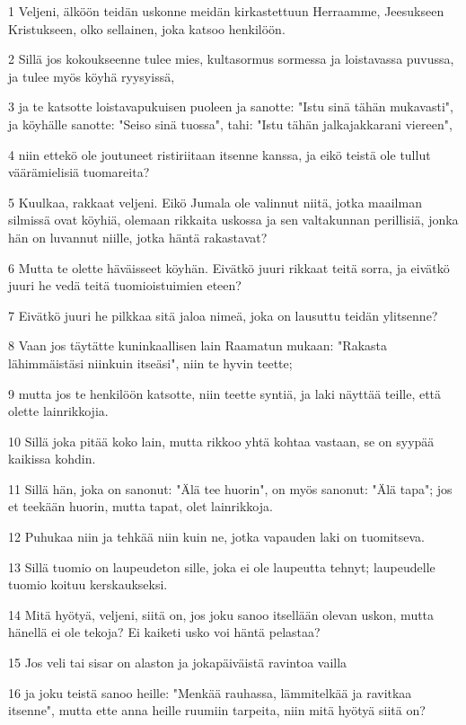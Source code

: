 \par 1 Veljeni, älköön teidän uskonne meidän kirkastettuun Herraamme, Jeesukseen Kristukseen, olko sellainen, joka katsoo henkilöön.
\par 2 Sillä jos kokoukseenne tulee mies, kultasormus sormessa ja loistavassa puvussa, ja tulee myös köyhä ryysyissä,
\par 3 ja te katsotte loistavapukuisen puoleen ja sanotte: "Istu sinä tähän mukavasti", ja köyhälle sanotte: "Seiso sinä tuossa", tahi: "Istu tähän jalkajakkarani viereen",
\par 4 niin ettekö ole joutuneet ristiriitaan itsenne kanssa, ja eikö teistä ole tullut väärämielisiä tuomareita?
\par 5 Kuulkaa, rakkaat veljeni. Eikö Jumala ole valinnut niitä, jotka maailman silmissä ovat köyhiä, olemaan rikkaita uskossa ja sen valtakunnan perillisiä, jonka hän on luvannut niille, jotka häntä rakastavat?
\par 6 Mutta te olette häväisseet köyhän. Eivätkö juuri rikkaat teitä sorra, ja eivätkö juuri he vedä teitä tuomioistuimien eteen?
\par 7 Eivätkö juuri he pilkkaa sitä jaloa nimeä, joka on lausuttu teidän ylitsenne?
\par 8 Vaan jos täytätte kuninkaallisen lain Raamatun mukaan: "Rakasta lähimmäistäsi niinkuin itseäsi", niin te hyvin teette;
\par 9 mutta jos te henkilöön katsotte, niin teette syntiä, ja laki näyttää teille, että olette lainrikkojia.
\par 10 Sillä joka pitää koko lain, mutta rikkoo yhtä kohtaa vastaan, se on syypää kaikissa kohdin.
\par 11 Sillä hän, joka on sanonut: "Älä tee huorin", on myös sanonut: "Älä tapa"; jos et teekään huorin, mutta tapat, olet lainrikkoja.
\par 12 Puhukaa niin ja tehkää niin kuin ne, jotka vapauden laki on tuomitseva.
\par 13 Sillä tuomio on laupeudeton sille, joka ei ole laupeutta tehnyt; laupeudelle tuomio koituu kerskaukseksi.
\par 14 Mitä hyötyä, veljeni, siitä on, jos joku sanoo itsellään olevan uskon, mutta hänellä ei ole tekoja? Ei kaiketi usko voi häntä pelastaa?
\par 15 Jos veli tai sisar on alaston ja jokapäiväistä ravintoa vailla
\par 16 ja joku teistä sanoo heille: "Menkää rauhassa, lämmitelkää ja ravitkaa itsenne", mutta ette anna heille ruumiin tarpeita, niin mitä hyötyä siitä on?
